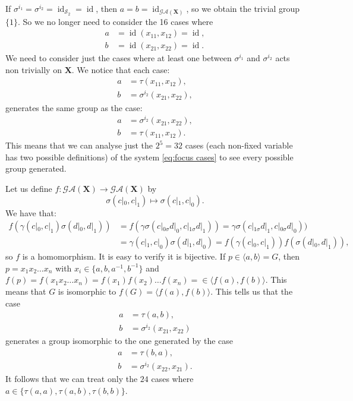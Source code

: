 \documentclass[mat1]{fmfdeloTS2.0}
\newcommand{\abece}{\mathbf{X}}			%
\newcommand{\synaut}{\mathcal{GA}}	%
\DeclareMathOperator{\symm}{\mathcal{S}}		%
\DeclareMathOperator{\id}{\mathrm{id}}			%
\begin{document}
If $\sigma^{i_1}=\sigma^{i_2}=\id_{\symm_2}=\id$, then $a=b=\id_{\synaut(\abece)}$, so we obtain the trivial group $\{1\}$. So we no longer need to consider the 16 cases where
\begin{equation*}
\begin{split}
a&=\id(x_{11},x_{12})=\id,\\
b&=\id(x_{21},x_{22})=\id.
\end{split}
\end{equation*}
We need to consider just the cases where at least one between $\sigma^{i_1}$ and $\sigma^{i_2}$ acts non trivially on $\abece$. We notice that each case:
\begin{equation}\label{eq:focus cases}
\begin{split}
a&=\tau(x_{11},x_{12}),\\
b&=\sigma^{i_2}(x_{21},x_{22}),
\end{split}
\end{equation}
generates the same group as the case:
\begin{equation*}
\begin{split}
a&=\sigma^{i_2}(x_{21},x_{22}),\\
b&=\tau(x_{11},x_{12}).
\end{split}
\end{equation*}
This means that we can analyse just the $2^5=32$ cases (each non-fixed variable has two possible definitions) of the system \eqref{eq:focus cases} to see every possible group generated. 

Let us define $f:\synaut(\abece)\longrightarrow\synaut(\abece)$ by 
\begin{equation}\label{eq:useful homo}
\sigma(c|_0,c|_1)\mapsto\sigma(c|_1,c|_0).
\end{equation}
We have that:
\begin{align*}
f(\gamma(c|_0,c|_1)\sigma(d|_0,d|_1))&=f(\gamma\sigma(c|_{0\sigma}d|_0,c|_{1\sigma}d|_1))=\gamma\sigma(c|_{1\sigma}d|_1,c|_{0\sigma}d|_0))\\
&=\gamma(c|_1,c|_0)\sigma(d|_1,d|_0)
=f(\gamma(c|_0,c|_1))f(\sigma(d|_0,d|_1)),
\end{align*}
so $f$ is a homomorphism. It is easy to verify it is bijective. If $p\in\langle a,b \rangle=G$, then $p=x_1x_2\ldots x_n$ with $x_i\in\{a,b,a^{-1},b^{-1}\}$ and $f(p)=f(x_1x_2\ldots x_n)=f(x_1)f(x_2)\ldots f(x_n)=\in\langle f(a),f(b)\rangle$. This means that $G$ is isomorphic to $f(G)=\langle f(a),f(b)\rangle$. This tells us that the case
\begin{equation*}
\begin{split}
a&=\tau(a,b),\\
b&=\sigma^{i_2}(x_{21},x_{22})
\end{split}
\end{equation*}
generates a group isomorphic to the one generated by the case
\begin{equation*}
\begin{split}
a&=\tau(b,a),\\
b&=\sigma^{i_2}(x_{22},x_{21}).
\end{split}
\end{equation*}
It follows that we can treat only the $24$ cases where $a\in\{\tau(a,a),\tau(a,b),\tau(b,b)\}$.
\end{document}
